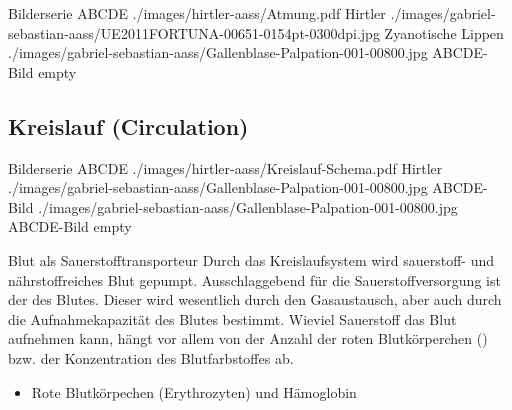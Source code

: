 {
}{}








\begin{PictureSeriesWide}{}{Bilderserie ABCDE}
{./images/hirtler-aass/Atmung.pdf}
{Hirtler}
{./images/gabriel-sebastian-aass/UE2011FORTUNA-00651-0154pt-0300dpi.jpg}
{Zyanotische Lippen }
{./images/gabriel-sebastian-aass/Gallenblase-Palpation-001-00800.jpg}
{ABCDE-Bild}
{empty}
{}
\end{PictureSeriesWide}


\clearpage
\subsection{{} Kreislauf
(Circulation)}


\begin{PictureSeriesWide}{}{Bilderserie ABCDE}
{./images/hirtler-aass/Kreislauf-Schema.pdf}
{Hirtler}
{./images/gabriel-sebastian-aass/Gallenblase-Palpation-001-00800.jpg}
{ABCDE-Bild}
{./images/gabriel-sebastian-aass/Gallenblase-Palpation-001-00800.jpg}
{ABCDE-Bild}
{empty}
{}
\end{PictureSeriesWide}




\label{bkm:RefHeading42514202}

{Blut als Sauerstofftransporteur}
{Durch das Kreislaufsystem wird sauerstoff- und
nährstoffreiches Blut gepumpt. Ausschlaggebend für die
Sauerstoffversorgung ist der  des
Blutes. Dieser wird wesentlich durch den Gasaustausch, aber
auch durch die Aufnahmekapazität des Blutes bestimmt.
Wieviel Sauerstoff das Blut aufnehmen kann, hängt vor allem
von der Anzahl der roten Blutkörperchen ()
bzw. der Konzentration des Blutfarbstoffes 
ab.}
{
\begin{itemize}
  \item Rote Blutkörpechen (Erythrozyten) und Hämoglobin
\end{itemize}
}
{}
{}
{}



